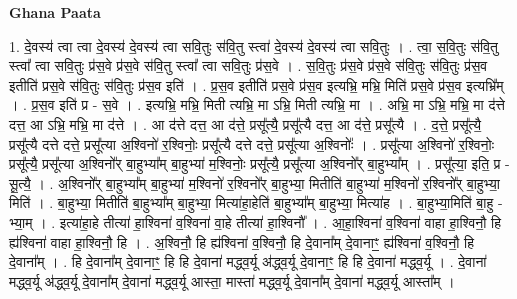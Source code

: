 \documentclass[17pt]{extarticle}
\begin{document}
\textbf{Ghana Paata } \newline

1. दे॒वस्य॑ त्वा त्वा दे॒वस्य॑ दे॒वस्य॑ त्वा सवि॒तुः स॑वि॒तु स्त्वा॑ दे॒वस्य॑ दे॒वस्य॑ त्वा सवि॒तुः । . त्वा॒ स॒वि॒तुः स॑वि॒तु स्त्वा᳚ त्वा सवि॒तुः प्र॑स॒वे प्र॑स॒वे स॑वि॒तु स्त्वा᳚ त्वा सवि॒तुः प्र॑स॒वे । . स॒वि॒तुः प्र॑स॒वे प्र॑स॒वे स॑वि॒तुः स॑वि॒तुः प्र॑स॒व इतीति॑ प्रस॒वे स॑वि॒तुः स॑वि॒तुः प्र॑स॒व इति॑ । . प्र॒स॒व इतीति॑ प्रस॒वे प्र॑स॒व इत्यभ्रि॒ मभ्रि॒ मिति॑ प्रस॒वे प्र॑स॒व इत्यभ्रि᳚म् । . प्र॒स॒व इति॑ प्र - स॒वे । . इत्यभ्रि॒ मभ्रि॒ मिती त्यभ्रि॒ मा ऽभ्रि॒ मिती त्यभ्रि॒ मा । . अभ्रि॒ मा ऽभ्रि॒ मभ्रि॒ मा द॑त्ते दत्त॒ आ ऽभ्रि॒ मभ्रि॒ मा द॑त्ते । . आ द॑त्ते दत्त॒ आ द॑त्ते॒ प्रसू᳚त्यै॒ प्रसू᳚त्यै दत्त॒ आ द॑त्ते॒ प्रसू᳚त्यै । . द॒त्ते॒ प्रसू᳚त्यै॒ प्रसू᳚त्यै दत्ते दत्ते॒ प्रसू᳚त्या अ॒श्विनो॑ र॒श्विनोः॒ प्रसू᳚त्यै दत्ते दत्ते॒ प्रसू᳚त्या अ॒श्विनोः᳚ । . प्रसू᳚त्या अ॒श्विनो॑ र॒श्विनोः॒ प्रसू᳚त्यै॒ प्रसू᳚त्या अ॒श्विनो᳚र् बा॒हुभ्या᳚म् बा॒हुभ्या॑ म॒श्विनोः॒ प्रसू᳚त्यै॒ प्रसू᳚त्या अ॒श्विनो᳚र् बा॒हुभ्या᳚म् । . प्रसू᳚त्या॒ इति॒ प्र - सू॒त्यै॒ । . अ॒श्विनो᳚र् बा॒हुभ्या᳚म् बा॒हुभ्या॑ म॒श्विनो॑ र॒श्विनो᳚र् बा॒हुभ्या॒ मितीति॑ बा॒हुभ्या॑ म॒श्विनो॑ र॒श्विनो᳚र् बा॒हुभ्या॒ मिति॑ । . बा॒हुभ्या॒ मितीति॑ बा॒हुभ्या᳚म् बा॒हुभ्या॒ मित्या॑हा॒हेति॑ बा॒हुभ्या᳚म् बा॒हुभ्या॒ मित्या॑ह । . बा॒हुभ्या॒मिति॑ बा॒हु - भ्या॒म् । . इत्या॑हा॒हे तीत्या॑ हा॒श्विना॑ व॒श्विना॑ वा॒हे तीत्या॑ हा॒श्विनौ᳚ । . आ॒हा॒श्विना॑ व॒श्विना॑ वाहा हा॒श्विनौ॒ हि ह्य॑श्विना॑ वाहा हा॒श्विनौ॒ हि । . अ॒श्विनौ॒ हि ह्य॑श्विना॑ व॒श्विनौ॒ हि दे॒वाना᳚म् दे॒वानाꣳ॒॒ ह्य॑श्विना॑ व॒श्विनौ॒ हि दे॒वाना᳚म् । . हि दे॒वाना᳚म् दे॒वानाꣳ॒॒ हि हि दे॒वाना॑ मद्ध्व॒र्यू अ॑द्ध्व॒र्यू दे॒वानाꣳ॒॒ हि हि दे॒वाना॑ मद्ध्व॒र्यू । . दे॒वाना॑ मद्ध्व॒र्यू अ॑द्ध्व॒र्यू दे॒वाना᳚म् दे॒वाना॑ मद्ध्व॒र्यू आस्ता॒ मास्ता॑ मद्ध्व॒र्यू दे॒वाना᳚म् दे॒वाना॑ मद्ध्व॒र्यू आस्ता᳚म् । \newline
\end{document}
